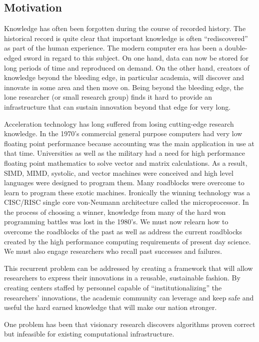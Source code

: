 \subsection{Motivation}
Knowledge has often been forgotten during the course of recorded history. The historical record is quite clear that important knowledge is often “rediscovered” as part of the human experience.
The modern computer era has been a double-edged sword in regard to this subject. On one hand, data can now be stored for long periods of time and reproduced on demand. On the other hand, creators of knowledge beyond the bleeding edge, in particular academia, will discover and innovate in some area and then move on. Being beyond the bleeding edge, the lone researcher (or small research group) finds it hard to provide an infrastructure that can sustain innovation beyond that edge for very long.

Acceleration technology has long suffered from losing cutting-edge research knowledge. In the 1970's commercial general purpose computers had very low floating point performance because accounting was the main application in use at that time. Universities as well as the military had a need for high performance floating point mathematics to solve vector and matrix calculations. As a result, SIMD, MIMD, systolic, and vector machines were conceived and high level languages were designed to program them. Many roadblocks were overcome to learn to program these exotic machines. Ironically the winning technology was a CISC/RISC single core von-Neumann architecture called the microprocessor. In the process of choosing a winner, knowledge from many of the hard won programming battles was lost in the 1980's. We must now relearn how to overcome the roadblocks of the past as well as address the current roadblocks created by the high performance computing requirements of present day science. We must also engage researchers who recall past successes and failures.

This recurrent problem can be addressed by creating a framework that will allow researchers to express their innovations in a reusable, sustainable fashion. By creating centers staffed by personnel capable of “institutionalizing” the researchers’ innovations, the academic community can leverage and keep safe and useful the hard earned knowledge that will make our nation stronger.

One problem has been that visionary research discovers algorithms proven correct but infeasible for existing computational infrastructure.
